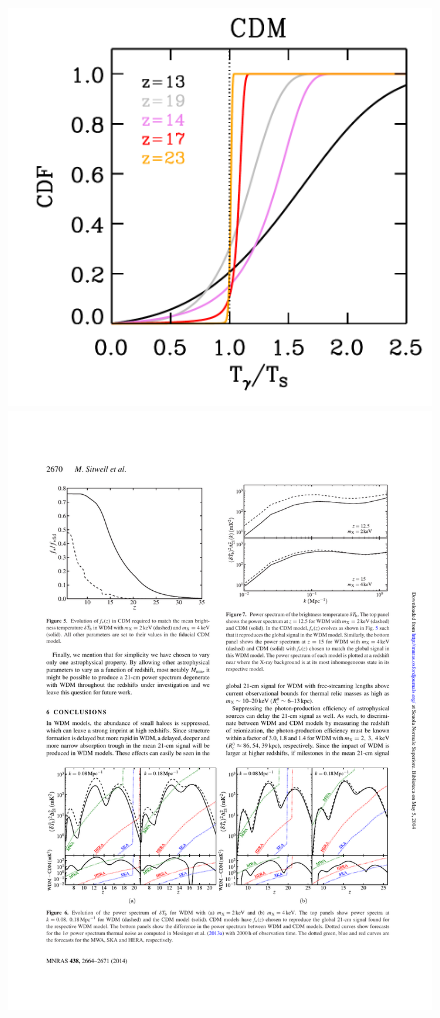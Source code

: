 \documentclass{PoS}
\begin{document}
\begin{figure}[htbp]
\begin{center}
\includegraphics[scale=0.4]{figures/THist_trim.pdf}
\includegraphics[scale=0.9]{figures/WDM_ps.pdf}

\end{center}
\end{figure}
\end{document}
